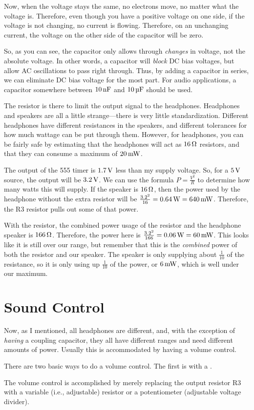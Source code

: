 Now, when the voltage stays the same, no electrons move, no matter what the voltage is.
Therefore, even though you have a positive voltage on one side, if the voltage is not changing, no current is flowing.
Therefore, on an unchanging current, the voltage on the other side of the capacitor will be zero.

So, as you can see, the capacitor only allows through \emph{changes} in voltage, not the absolute voltage.
In other words, a capacitor will \emph{block} DC bias voltages, but allow AC oscillations to pass right through.
Thus, by adding a capacitor in series, we can eliminate DC bias voltage for the most part.
For audio applications, a capacitor somewhere between $10\,\si{\nano\farad}$ and $10\,\si{\micro\farad}$ should be used.

The resistor is there to limit the output signal to the headphones.
Headphones and speakers are all a little strange---there is very little standardization.
Different headphones have different resistances in the speakers, and different tolerances for how much wattage can be put through them.
However, for headphones, you can be fairly safe by estimating that the headphones will act as $16\,\si{\ohm}$ resistors, and that they can consume a maximum of $20\,\si{\milli\watt}$.

The output of the 555 timer is $1.7\,\si{\volt}$ less than my supply voltage.
So, for a $5\,\si{\volt}$ source, the output will be $3.2\,\si{\volt}$. 
We can use the formula $P = \frac{V^2}{R}$ to determine how many watts this will supply.
If the speaker is $16\,\si{\ohm}$, then the power used by the headphone without the extra resistor will be $\frac{3.2^2}{16} = 0.64\,\si{\watt} = 640\,\si{\milli\watt}$.
Therefore, the R3 resistor pulls out some of that power.

With the resistor, the combined power usage of the resistor and the headphone speaker is $166\,\si{\ohm}$.
Therefore, the power here is $\frac{3.2^2}{166} = 0.06\,\si{\watt} = 60\,\si{\milli\watt}$.
This looks like it is still over our range, but remember that this is the \emph{combined} power of both the resistor and our speaker.
The speaker is only supplying about $\frac{1}{10}$ of the resistance, so it is only using up $\frac{1}{10}$ of the power, or $6\,\si{\milli\watt}$, which is well under our maximum.

\section{Sound Control}

Now, as I mentioned, all headphones are different, and, with the exception of \emph{having} a coupling capacitor, they all have different ranges and need different amounts of power.
Usually this is accommodated by having a volume control.

There are two basic ways to do a volume control.
The first is with a .


The volume control is accomplished by merely replacing the output resistor R3 with a variable (i.e., adjustable) resistor or a potentiometer (adjustable voltage divider).


